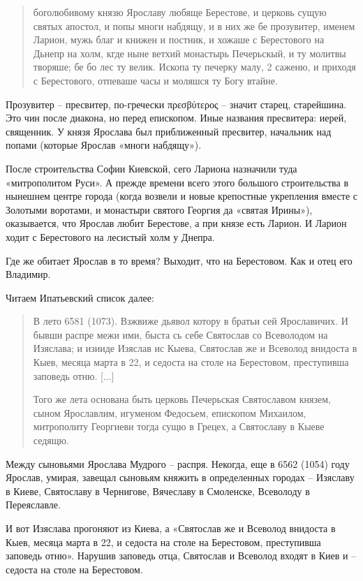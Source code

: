 \documentclass[a5paper,11pt,openany]{article}
\begin{document}
\begin{quotation}
\noindent боголюбивому князю Ярославу любяще Берестове, и церковь сущую святых апостол, и попы многи набдящу, и в них же бе прозувитер, именем Ларион, мужь благ и книжен и постник, и хожаше с Берестового на Дьнепр на холм, кгде ныне ветхий монастырь Печерьскый, и ту молитвы творяше; бе бо лес ту велик. Ископа ту печерку малу, 2 саженю, и приходя с Берестового, отпеваше часы и моляшся ту Богу втайне.
\end{quotation}

Прозувитер – пресвитер, по-гречески πρεσβύτερος – значит старец, старейшина. Это чин после диакона, но перед епископом. Иные названия пресвитера: иерей, священник. У князя Ярослава был приближенный пресвитер, начальник над попами (которые Ярослав «многи набдящу»).

После строительства Софии Киевской, сего Лариона назначили туда «митрополитом Руси». А прежде времени всего этого большого строительства в нынешнем центре города (когда возвели и новые крепостные укрепления вместе с Золотыми воротами, и монастыри святого Георгия да «святая Ирины»), оказывается, что Ярослав любит Берестове, а при князе есть Ларион. И Ларион ходит с Берестового на лесистый холм у Днепра.

Где же обитает Ярослав в то время? Выходит, что на Берестовом. Как и отец его Владимир.

Читаем Ипатьевский список далее:

\begin{quotation}
\noindent В лето 6581 (1073). Взжвиже дьявол котору в братьи сей Ярославичих. И бывши распре межи ими, быста сь себе Святослав со Всеволодом на Изяслава; и изииде Изяслав ис Кыева, Святослав же и Всеволод внидоста в Кыев, месяца марта в 22, и седоста на столе на Берестовом, преступивша заповедь отню. [...]

Того же лета основана быть церковь Печерьская Святославом князем, сыном Ярославлим, игуменом Федосьем, епископом Михаилом, митрополиту Георгиеви тогда сущю в Грецех, а Святославу в Кыеве седящю.
\end{quotation}

Между сыновьями Ярослава Мудрого – распря. Некогда, еще в 6562 (1054) году Ярослав, умирая, завещал сыновьям княжить в определенных городах – Изяславу в Киеве, Святославу в Чернигове, Вячеславу в Смоленске, Всеволоду в Переяславле. 

И вот Изяслава прогоняют из Киева, а «Святослав же и Всеволод внидоста в Кыев, месяца марта в 22, и седоста на столе на Берестовом, преступивша заповедь отню». Нарушив заповедь отца, Святослав и Всеволод входят в Киев и – седоста на столе на Берестовом.
\end{document}
